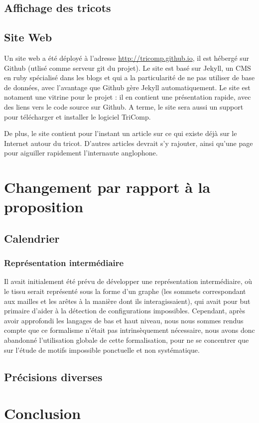 \documentclass{article}
\begin{document}
\subsection{Affichage des tricots}

\subsection{Site Web}

Un site web a été déployé à l'adresse \url{http://tricomp.github.io}, il est hébergé sur Github (utlisé comme serveur git du projet). Le site est basé sur Jekyll, un CMS en ruby spécialisé dans les blogs et qui a la particularité de ne pas utiliser de base de données, avec l'avantage que Github gère Jekyll automatiquement. Le site est notament une vitrine pour le projet : il en contient une présentation rapide, avec des liens vers le code source sur Github. A terme, le site sera aussi un support pour télécharger et installer le logiciel TriComp.

De plus, le site contient pour l'instant un article sur ce qui existe déjà sur le Internet autour du tricot. D'autres articles devrait s'y rajouter, ainsi qu'une page pour aiguiller rapidement l'internaute anglophone.

\section{Changement par rapport à la proposition}

\subsection{Calendrier}

\subsubsection{Représentation intermédiaire}

Il avait initialement été prévu de développer une représentation intermédiaire, où le tissu serait représenté sous la forme d'un graphe (les sommets 
correspondant aux mailles et les arêtes à la manière dont ils interagissaient), qui avait pour but primaire d'aider à la détection de configurations 
impossibles. Cependant, après avoir approfondi les langages de bas et haut niveau, nous nous sommes rendus compte que ce formalisme n'était pas 
intrinsèquement nécessaire, nous avons donc abandonné l'utilisation globale de cette formalisation, pour ne se concentrer que sur l'étude de motifs 
impossible ponctuelle et non systématique.

\subsection{Précisions diverses}

\section*{Conclusion}
\end{document}
